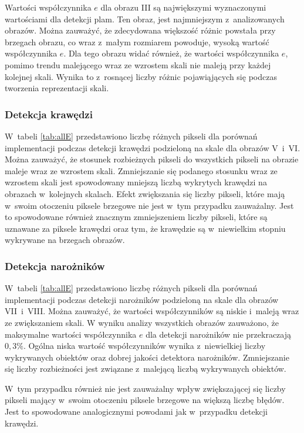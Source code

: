 Wartości współczynnika $ e $ dla obrazu III są największymi wyznaczonymi wartościami dla detekcji plam. Ten obraz, jest najmniejszym z~analizowanych obrazów. Można zauważyć, że zdecydowana większość różnic powstała przy brzegach obrazu, co wraz z~małym rozmiarem powoduje, wysoką wartość współczynnika $ e $. Dla tego obrazu widać również, że wartości współczynnika $ e $, pomimo trendu malejącego wraz ze wzrostem skali nie maleją przy każdej kolejnej skali. Wynika to z~rosnącej liczby różnic pojawiąjących się podczas tworzenia reprezentacji skali.


\subsubsection{Detekcja krawędzi}
\label{subsubsec:krawedzieTabele}

W~tabeli \ref{tab:allE} przedstawiono liczbę różnych pikseli dla porównań implementacji podczas detekcji krawędzi podzieloną na skale dla obrazów V~i~VI. Można zauważyć, że stosunek rozbieżnych pikseli do wszystkich pikseli na obrazie maleje wraz ze wzrostem skali. Zmniejszanie się podanego stosunku wraz ze wzrostem skali jest spowodowany mniejszą liczbą wykrytych krawędzi na obrazach w~kolejnych skalach. Efekt zwiększania się liczby pikseli, które mają w~swoim otoczeniu piksele brzegowe nie jest w~tym przypadku zauważalny. Jest to spowodowane również znacznym zmniejszeniem liczby pikseli, które są uznawane za piksele krawędzi oraz tym, że krawędzie są w~niewielkim stopniu wykrywane na brzegach obrazów.

\subsubsection{Detekcja narożników}
\label{subsubsec:naroznikiTabele}

W~tabeli \ref{tab:allE} przedstawiono liczbę różnych pikseli dla porównań implementacji podczas detekcji narożników podzieloną na skale dla obrazów VII~i~VIII. Można zauważyć, że wartości współczynników są niskie i~maleją wraz ze zwiększaniem skali. W wyniku analizy wszystkich obrazów zauważono, że maksymalne wartości współczynnika $ e $ dla detekcji narożników nie przekraczają $ 0,3 \% $. Ogólna niska wartość współczynników wynika z~niewielkiej liczby wykrywanych obiektów oraz dobrej jakości detektora narożników. Zmniejszanie się liczby rozbieżności jest związane z~malejącą liczbą wykrywanych obiektów.

W~tym przypadku również nie jest zauważalny wpływ zwiększającej się liczby pikseli mający w~swoim otoczeniu piksele brzegowe na większą liczbę błędów. Jest to spowodowane analogicznymi powodami jak w~przypadku detekcji krawędzi.

